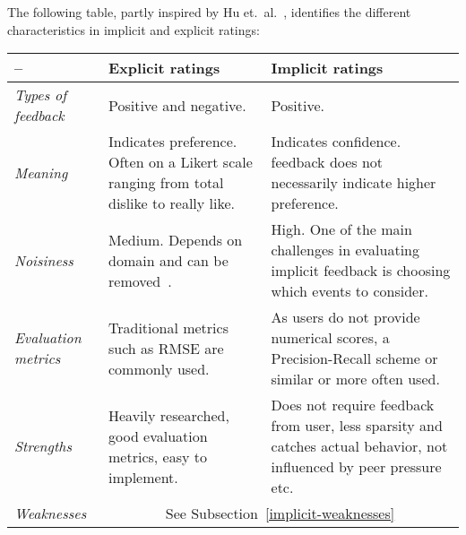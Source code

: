 The following table, partly inspired by Hu et.\ al.~\cite{Hu2008}, identifies
the different characteristics in implicit and explicit ratings:

\begin{table}[H]
    \begin{tabular}{l p{6cm} p{6cm}}
    \toprule
    –                  & \textbf{Explicit ratings}
                       & \textbf{Implicit ratings} \\ \midrule

    \textit{Types of feedback}  
                       & Positive and negative.
                       & Positive. \\ \midrule

    \textit{Meaning}
                       & Indicates preference. Often on a Likert scale ranging
                         from total dislike to really like.
                       & Indicates confidence.
                         feedback does not necessarily indicate higher
                         preference. \\ \midrule

    \textit{Noisiness}
                       & Medium. Depends on domain and can be removed~\cite{amatriain2009like}.
                       & High. One of the main challenges in evaluating
                         implicit feedback is choosing which events to
                         consider. \\ \midrule

    \textit{Evaluation metrics}
                       & Traditional metrics such as RMSE are commonly used.
                       & As users do not provide numerical scores, a
                         Precision-Recall scheme or similar or more often used.
                         \\ \midrule

    \textit{Strengths}
                       & Heavily researched, good evaluation metrics, easy to
                         implement.
                       & Does not require feedback from user, less sparsity and
                         catches actual behavior, not influenced by peer
                         pressure etc. \\ \midrule

    \textit{Weaknesses}
                       & \multicolumn{2}{c}{See Subsection~\ref{implicit-weaknesses}} \\
    \bottomrule
    \end{tabular}
\end{table}

